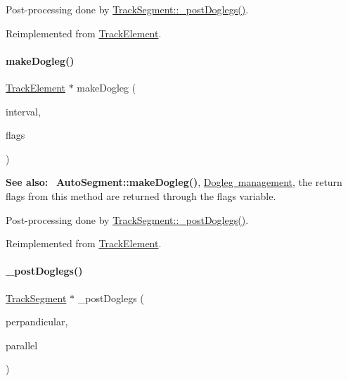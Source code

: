 Post-\/processing done by \mbox{\hyperlink{classKite_1_1TrackSegment_a10a45c049d0bd7d01c7eff1c5441c7a2}{Track\+Segment\+::\+\_\+post\+Doglegs()}}. 

Reimplemented from \mbox{\hyperlink{classKite_1_1TrackElement_a7a9637875364e84e6862de0102341715}{Track\+Element}}.

\mbox{\label{classKite_1_1TrackSegment_a524f1569b2f2c1a84df2fe47e84e28ed}} 
\paragraph{\texorpdfstring{make\+Dogleg()}{makeDogleg()}\hspace{0.1cm}{\footnotesize\ttfamily [2/2]}}
{\footnotesize\ttfamily \mbox{\hyperlink{classKite_1_1TrackElement}{Track\+Element}} $\ast$ make\+Dogleg (\begin{DoxyParamCaption}\item[{\textbf{ Interval}}]{interval,  }\item[{unsigned int \&}]{flags }\end{DoxyParamCaption})\hspace{0.3cm}{\ttfamily [virtual]}}

{\bfseries See also\+:}~ \textbf{ Auto\+Segment\+::make\+Dogleg()}, \mbox{\hyperlink{classKite_1_1TrackSegment_secDogleg}{Dogleg management}}, the return flags from this method are returned through the {\ttfamily flags} variable.

Post-\/processing done by \mbox{\hyperlink{classKite_1_1TrackSegment_a10a45c049d0bd7d01c7eff1c5441c7a2}{Track\+Segment\+::\+\_\+post\+Doglegs()}}. 

Reimplemented from \mbox{\hyperlink{classKite_1_1TrackElement_a524f1569b2f2c1a84df2fe47e84e28ed}{Track\+Element}}.

\mbox{\label{classKite_1_1TrackSegment_a10a45c049d0bd7d01c7eff1c5441c7a2}} 
\paragraph{\texorpdfstring{\+\_\+post\+Doglegs()}{\_postDoglegs()}}
{\footnotesize\ttfamily \mbox{\hyperlink{classKite_1_1TrackSegment}{Track\+Segment}} $\ast$ \+\_\+post\+Doglegs (\begin{DoxyParamCaption}\item[{\mbox{\hyperlink{classKite_1_1TrackElement}{Track\+Element}} $\ast$\&}]{perpandicular,  }\item[{\mbox{\hyperlink{classKite_1_1TrackElement}{Track\+Element}} $\ast$\&}]{parallel }\end{DoxyParamCaption})\hspace{0.3cm}{\ttfamily [virtual]}}

